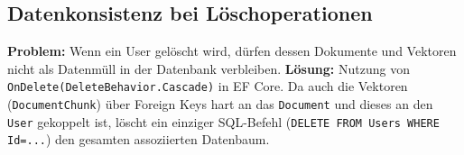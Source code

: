\subsection{Datenkonsistenz bei Löschoperationen}
\textbf{Problem:} Wenn ein User gelöscht wird, dürfen dessen Dokumente und Vektoren nicht als \glqq{}Datenmüll\grqq{} in der Datenbank verbleiben.
\textbf{Lösung:} Nutzung von \texttt{OnDelete(DeleteBehavior.Cascade)} in EF Core. Da auch die Vektoren (\texttt{DocumentChunk}) über Foreign Keys hart an das \texttt{Document} und dieses an den \texttt{User} gekoppelt ist, löscht ein einziger SQL-Befehl (\texttt{DELETE FROM Users WHERE Id=...}) den gesamten assoziierten Datenbaum.
